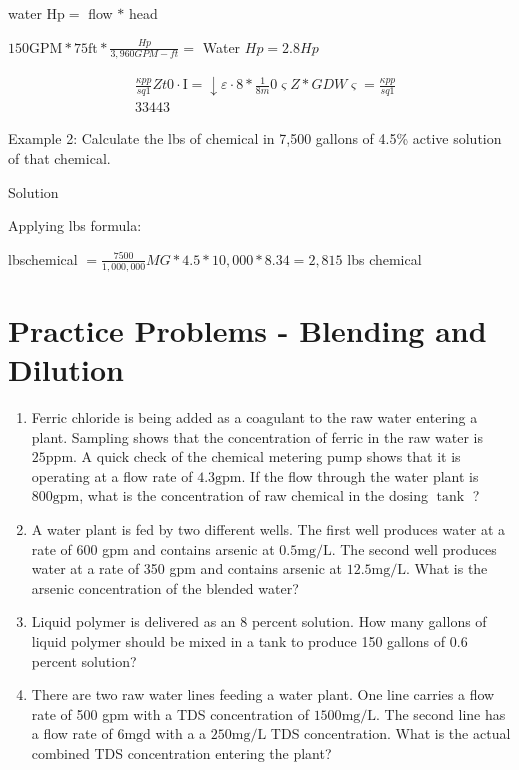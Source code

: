 \documentclass[10pt]{article}
\begin{document}
\begin{enumerate}
\begin{enumerate}
water $\mathrm{Hp}=$ flow $*$ head

$150 \mathrm{GPM} * 75 \mathrm{ft} * \frac{H p}{3,960 G P M-f t}=$ Water $H p=2.8 H p$

$$
\begin{aligned}
& \frac{\kappa p p}{s q 1} Z t 0 \cdot \mathrm{I}=\downarrow \varepsilon \cdot 8 * \frac{1}{8 m} 0 \varsigma Z * G D W \varsigma=\frac{\kappa p p}{s q 1} \\
& \text {33443 }
\end{aligned}
$$


Example 2: Calculate the lbs of chemical in 7,500 gallons of 4.5\% active solution of that chemical.

Solution

Applying lbs formula:

lbschemical $=\frac{7500}{1,000,000} M G * 4.5 * 10,000 * 8.34=2,815$ lbs chemical

\section{Practice Problems - Blending and Dilution}
\begin{enumerate}
  \item Ferric chloride is being added as a coagulant to the raw water entering a plant. Sampling shows that the concentration of ferric in the raw water is $25 \mathrm{ppm}$. A quick check of the chemical metering pump shows that it is operating at a flow rate of $4.3 \mathrm{gpm}$. If the flow through the water plant is $800 \mathrm{gpm}$, what is the concentration of raw chemical in the dosing $\operatorname{tank}$ ?

  \item A water plant is fed by two different wells. The first well produces water at a rate of 600 gpm and contains arsenic at $0.5 \mathrm{mg} / \mathrm{L}$. The second well produces water at a rate of 350 gpm and contains arsenic at $12.5 \mathrm{mg} / \mathrm{L}$. What is the arsenic concentration of the blended water?

  \item Liquid polymer is delivered as an 8 percent solution. How many gallons of liquid polymer should be mixed in a tank to produce 150 gallons of $0.6$ percent solution?

  \item There are two raw water lines feeding a water plant. One line carries a flow rate of 500 gpm with a TDS concentration of $1500 \mathrm{mg} / \mathrm{L}$. The second line has a flow rate of $6 \mathrm{mgd}$ with a a $250 \mathrm{mg} / \mathrm{L}$ TDS concentration. What is the actual combined TDS concentration entering the plant?


\end{enumerate}
\end{enumerate}
\end{enumerate}
\end{document}
